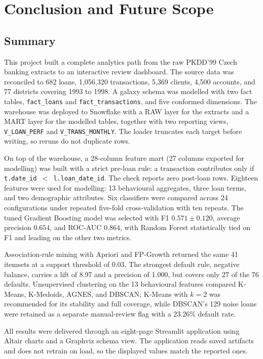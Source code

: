 \chapter{Conclusion and Future Scope}

\section{Summary}
This project built a complete analytics path from the raw PKDD'99 Czech banking extracts to an interactive review dashboard. The source data was reconciled to 682 loans, 1,056,320 transactions, 5,369 clients, 4,500 accounts, and 77 districts covering 1993 to 1998. A galaxy schema was modelled with two fact tables, \texttt{fact\_loans} and \texttt{fact\_transactions}, and five conformed dimensions. The warehouse was deployed to Snowflake with a RAW layer for the extracts and a MART layer for the modelled tables, together with two reporting views, \texttt{V\_LOAN\_PERF} and \texttt{V\_TRANS\_MONTHLY}. The loader truncates each target before writing, so reruns do not duplicate rows.

On top of the warehouse, a 28-column feature mart (27 columns exported for modelling) was built with a strict pre-loan rule: a transaction contributes only if \texttt{t.date\_id $<$ l.loan\_date\_id}. The check reports zero post-loan rows. Eighteen features were used for modelling: 13 behavioural aggregates, three loan terms, and two demographic attributes. Six classifiers were compared across 24 configurations under repeated five-fold cross-validation with ten repeats. The tuned Gradient Boosting model was selected with F1 $0.571 \pm 0.120$, average precision $0.654$, and ROC-AUC $0.864$, with Random Forest statistically tied on F1 and leading on the other two metrics.

Association-rule mining with Apriori and FP-Growth returned the same 41 itemsets at a support threshold of 0.03. The strongest default rule, negative balance, carries a lift of 8.97 and a precision of 1.000, but covers only 27 of the 76 defaults. Unsupervised clustering on the 13 behavioural features compared K-Means, K-Medoids, AGNES, and DBSCAN; K-Means with $k=2$ was recommended for its stability and full coverage, while DBSCAN's 129 noise loans were retained as a separate manual-review flag with a 23.26\% default rate.

All results were delivered through an eight-page Streamlit application using Altair charts and a Graphviz schema view. The application reads saved artifacts and does not retrain on load, so the displayed values match the reported ones.

